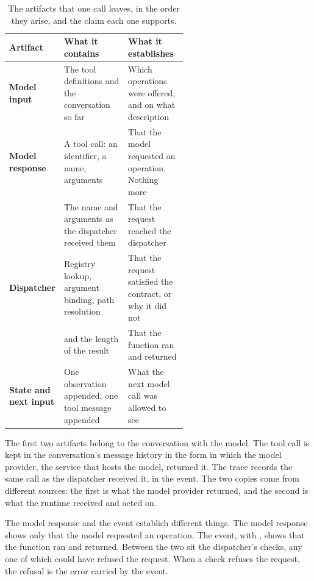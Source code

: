 \begin{table}[htbp]
  \centering
  \caption{The artifacts that one  call leaves, in the order they arise, and the
  claim each one supports.}
  \label{tab:boundary-artifacts}
  \begin{adjustbox}{width=\linewidth}\begin{tabularx}{\linewidth}{@{}L{0.22\linewidth}L{0.36\linewidth}X@{}}
    \toprule
    \textbf{Artifact} & \textbf{What it contains} & \textbf{What it establishes} \\
    \midrule
    \textbf{Model input} & The tool definitions and the conversation so far & Which operations
      were offered, and on what description \\
    \textbf{Model response} & A tool call: an identifier, a name, arguments & That the model
      requested an operation. Nothing more \\
    \textbf{} & The name and arguments as the dispatcher received them &
      That the request reached the dispatcher \\
    \textbf{Dispatcher} & Registry lookup, argument binding, path resolution & That the request
      satisfied the contract, or why it did not \\
    \textbf{} &  and the length of the result & That the
      function ran and returned \\
    \textbf{State and next input} & One observation appended, one tool message appended & What the
      next model call was allowed to see \\
    \bottomrule
  \end{tabularx}\end{adjustbox}
\end{table}

The first two artifacts belong to the conversation with the model. The tool call is kept in the
conversation's message history in the form in which the model provider, the service that hosts the
model, returned it. The trace records the same call as the dispatcher received it, in the
 event. The two copies come from different sources: the first is what the
model provider returned, and the second is what the runtime received and acted on.

The model response and the  event establish different things. The model
response shows only that the model requested an operation. The  event, with
, shows that the function ran and returned. Between the two sit the dispatcher's
checks, any one of which could have refused the request. When a check refuses the request, the
refusal is the error carried by the  event.

